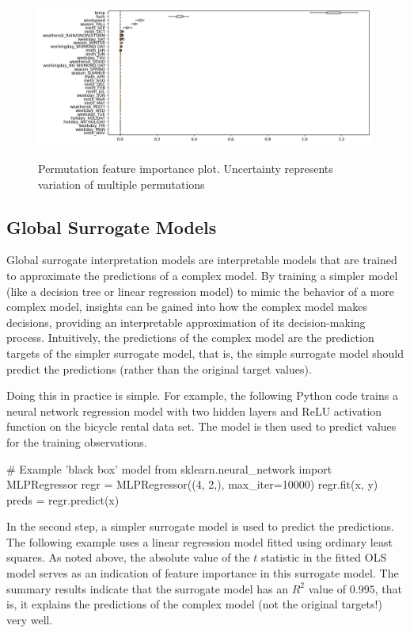 \begin{figure}
\centering

\includegraphics[width=.75\textwidth]{pfi_tree.png} \\
\caption[Permutation feature importance plot]{Permutation feature importance plot. Uncertainty represents variation of multiple permutations}
\label{fig:pfi}
\end{figure}

\subsection{Global Surrogate Models}

Global surrogate interpretation models are interpretable models that are trained to approximate the predictions of a complex model. By training a simpler model (like a decision tree or linear regression model) to mimic the behavior of a more complex model, insights can be gained into how the complex model makes decisions, providing an interpretable approximation of its decision-making process. Intuitively, the predictions of the complex model are the prediction targets of the simpler surrogate model, that is, the simple surrogate model should predict the predictions (rather than the original target values).

Doing this in practice is simple. For example, the following Python code trains a neural network regression model with two hidden layers and ReLU activation function on the bicycle rental data set. The model is then used to predict values for the training observations.

\begin{samepage}
\begin{pythoncode}
# Example 'black box' model
from sklearn.neural_network import MLPRegressor
regr = MLPRegressor((4, 2,), max_iter=10000)
regr.fit(x, y)
preds = regr.predict(x)
\end{pythoncode}
\end{samepage}

In the second step, a simpler surrogate model is used to predict the predictions. The following example uses a linear regression model fitted using ordinary least squares. As noted above, the absolute value of the $t$ statistic in the fitted OLS model serves as an indication of feature importance in this surrogate model. The summary results indicate that the surrogate model has an $R^2$ value of $0.995$, that is, it explains the predictions of the complex model (not the original targets!) very well. 

